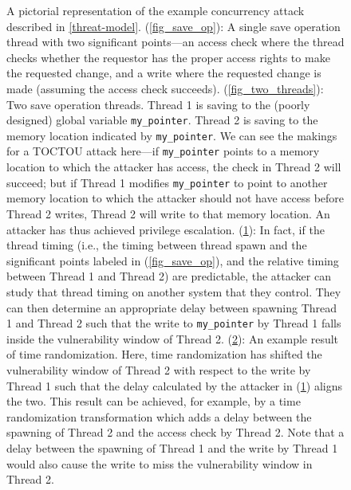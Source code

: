 \begin{figure}
\begin{subfigure}{\columnwidth}
		\caption{}
		\label{fig_attack}
	\end{subfigure}
	\begin{subfigure}{\columnwidth}
		\caption{}
		\label{fig_thwart}
	\end{subfigure}
	\caption{
		A pictorial representation of the example concurrency attack described in \autoref{threat-model}.
		(\ref{fig_save_op}): A single save operation thread with two significant points---an access check where the thread checks whether the requestor has the proper access rights to make the requested change, and a write where the requested change is made (assuming the access check succeeds).
		(\ref{fig_two_threads}): Two save operation threads.
		Thread 1 is saving to the (poorly designed) global variable \texttt{my\_pointer}.
		Thread 2 is saving to the memory location indicated by \texttt{my\_pointer}.
		We can see the makings for a TOCTOU attack here---if \texttt{my\_pointer} points to a memory location to which the attacker has access, the check in Thread 2 will succeed; but if Thread 1 modifies \texttt{my\_pointer} to point to another memory location to which the attacker should not have access before Thread 2 writes, Thread 2 will write to that memory location.
		An attacker has thus achieved privilege escalation.
		(\ref{fig_attack}): In fact, if the thread timing (i.e., the timing between thread spawn and the significant points labeled in (\ref{fig_save_op}), and the relative timing between Thread 1 and Thread 2) are predictable, the attacker can study that thread timing on another system that they control.
		They can then determine an appropriate delay between spawning Thread 1 and Thread 2 such that the write to \texttt{my\_pointer} by Thread 1 falls inside the vulnerability window of Thread 2.
		(\ref{fig_thwart}): An example result of time randomization.
		Here, time randomization has shifted the vulnerability window of Thread 2 with respect to the write by Thread 1 such that the delay calculated by the attacker in (\ref{fig_attack}) aligns the two.
		This result can be achieved, for example, by a time randomization transformation which adds a delay between the spawning of Thread 2 and the access check by Thread 2.
		Note that a delay between the spawning of Thread 1 and the write by Thread 1 would also cause the write to miss the vulnerability window in Thread 2.
	}
	\label{fig_exploitation}
\end{figure}
